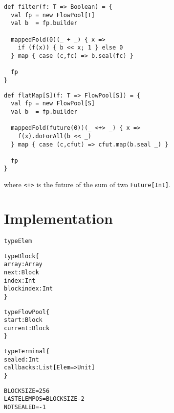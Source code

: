 \documentclass[runningheads,a4paper]{llncs}
\begin{document}
\begin{verbatim}
def filter(f: T => Boolean) = {
  val fp = new FlowPool[T]
  val b  = fp.builder

  mappedFold(0)(_ + _) { x =>
    if (f(x)) { b << x; 1 } else 0
  } map { case (c,fc) => b.seal(fc) }

  fp
}
\end{verbatim}

\begin{verbatim}
def flatMap[S](f: T => FlowPool[S]) = {
  val fp = new FlowPool[S]
  val b  = fp.builder

  mappedFold(future(0))(_ <+> _) { x =>
    f(x).doForAll(b << _)
  } map { case (c,cfut) => cfut.map(b.seal _) }

  fp
}
\end{verbatim}
where \verb|<+>| is the future of the sum of two \verb+Future[Int]+.

\section{Implementation}

\begin{alltt}
{\scriptsize
type Elem

type Block \{
  array: Array
  next: Block
  index: Int
  blockindex: Int
\}

type FlowPool \{
  start: Block
  current: Block
\}

type Terminal \{
  sealed: Int
  callbacks: List[Elem => Unit]
\}

BLOCKSIZE = 256
LASTELEMPOS = BLOCKSIZE - 2
NOTSEALED = -1
}
\end{alltt}


\setlength\linenumbersep{2pt}
\end{document}
